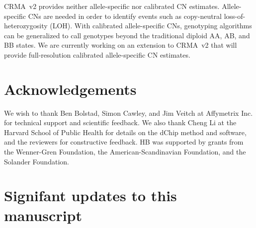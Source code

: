 \documentclass{bioinfo}
\begin{document}
CRMA~v2 provides neither allele-specific nor calibrated CN estimates.  Allele-specific CNs are needed in order to identify events such as copy-neutral loss-of-heterozygosity (LOH).  With calibrated allele-specific CNs, genotyping algorithms can be generalized to call genotypes beyond the traditional diploid AA, AB, and BB states.  We are currently working on an extension to CRMA~v2 that will provide full-resolution calibrated allele-specific CN estimates.

  

    

    

\section*{Acknowledgements}
We wish to thank Ben Bolstad, Simon Cawley, and Jim Veitch at Affymetrix Inc. for technical support and scientific feedback.
We also thank Cheng Li at the Harvard School of Public Health for details on the dChip method and software, and the reviewers for constructive feedback.
HB was supported by grants from the Wenner-Gren Foundation, the American-Scandinavian Foundation, and the Solander Foundation.\\[1ex]





 

\clearpage
\section*{Signifant updates to this manuscript}
\theendnotes
\end{document}
